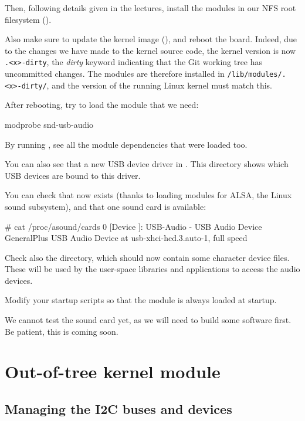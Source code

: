 Then, following details given in the lectures, install the modules in our NFS
root filesystem ().

Also make sure to update the kernel image (), and reboot the
board.  Indeed, due to the changes we have made to the kernel source code,
the kernel version is now \texttt{\workingkernel.<x>-dirty}, the {\em dirty}
keyword indicating that the Git working tree has uncommitted changes.
The modules are therefore installed in \texttt{/lib/modules/\workingkernel.<x>-dirty/},
and the version of the running Linux kernel must match this.

After rebooting, try to load the module that we need:

\begin{bashinput}
modprobe snd-usb-audio
\end{bashinput}

By running , see all the module dependencies that
were loaded too.

You can also see that a new USB device driver in
. This directory shows which
USB devices are bound to this driver.

You can check that  now exists (thanks to loading
modules for ALSA, the Linux sound subsystem), and that one sound
card is available:

\begin{bashinput}
# cat /proc/asound/cards
 0 [Device         ]: USB-Audio - USB Audio Device
                      GeneralPlus USB Audio Device at usb-xhci-hcd.3.auto-1, full speed
\end{bashinput}

Check also the  directory, which should now contain
some character device files. These will be used by the user-space
libraries and applications to access the audio devices.

Modify your startup scripts so that the  module
is always loaded at startup.

We cannot test the sound card yet, as we will need to build some
software first. Be patient, this is coming soon.

\section{Out-of-tree kernel module}

\subsection{Managing the I2C buses and devices}

